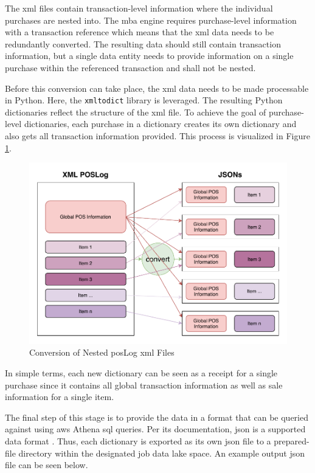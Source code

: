 The \ac{xml} files contain transaction-level information where the individual purchases are nested into. The \ac{mba} engine requires purchase-level information with a transaction reference which means that the \ac{xml} data needs to be redundantly converted. The resulting data should still contain transaction information, but a single data entity needs to provide information on a single purchase within the referenced transaction and shall not be nested.

Before this conversion can take place, the \ac{xml} data needs to be made processable in Python. Here, the \texttt{xmltodict} library is leveraged. The resulting Python dictionaries reflect the structure of the \ac{xml} file. To achieve the goal of purchase-level dictionaries, each purchase in a dictionary creates its own dictionary and also gets all transaction information provided. This process is visualized in Figure \ref{fig:3-convert-process}.

\begin{figure}[h!]
	\centering
	\includegraphics[width=0.67\linewidth]{main-matter/img/3-convert-process.pdf}
	\caption{Conversion of Nested \acs{pos}Log \acs{xml} Files}
	\label{fig:3-convert-process}
\end{figure}

In simple terms, each new dictionary can be seen as a receipt for a single purchase since it contains all global transaction information as well as sale information for a single item.

The final step of this stage is to provide the data in a format that can be queried against using \ac{aws} Athena \ac{sql} queries. Per its documentation, \ac{json} is a supported data format \cite{athena}. Thus, each dictionary is exported as its own \ac{json} file to a prepared-file directory within the designated job data lake space. An example output \ac{json} file can be seen below.

